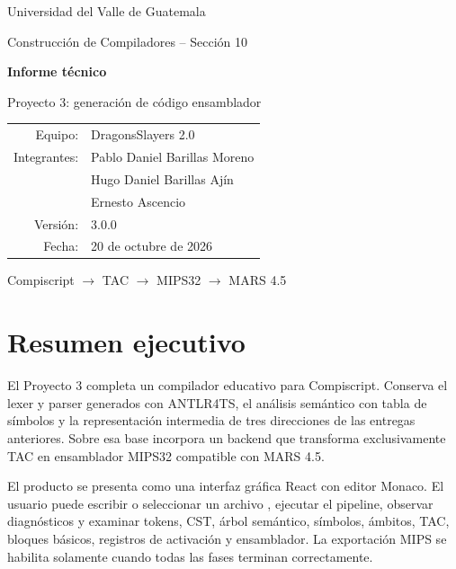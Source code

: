 \documentclass[11pt,letterpaper,oneside]{report}
\newcommand{\archivo}[1]{\texttt{\detokenize{#1}}}
\begin{document}
\begin{titlepage}
  \pagecolor{crema}\color{negro}
  \centering
  \vspace*{1.5cm}
  {\Large Universidad del Valle de Guatemala\par}
  \vspace{0.4cm}
  {\large Construcci\'on de Compiladores -- Secci\'on 10\par}
  \vspace{2cm}
  \vspace{1.4cm}

  {\Huge\bfseries Informe t\'ecnico\par}
  \vspace{0.3cm}
  {\LARGE Proyecto 3: generaci\'on de c\'odigo ensamblador\par}
  \vfill
  \begin{tabular}{rl}
    Equipo: & DragonsSlayers 2.0\\
    Integrantes: & Pablo Daniel Barillas Moreno\\
                 & Hugo Daniel Barillas Aj\'in\\
                 & Ernesto Ascencio\\
    Versi\'on: & 3.0.0\\
    Fecha: & 20 de octubre de 2026
  \end{tabular}
  \vfill
  {\large Compiscript $\rightarrow$ TAC $\rightarrow$ MIPS32 $\rightarrow$ MARS 4.5\par}
\end{titlepage}
\nopagecolor

\tableofcontents

\chapter{Resumen ejecutivo}

El Proyecto 3 completa un compilador educativo para Compiscript. Conserva el lexer y parser generados con ANTLR4TS, el an\'alisis sem\'antico con tabla de s\'imbolos y la representaci\'on intermedia de tres direcciones de las entregas anteriores. Sobre esa base incorpora un backend que transforma exclusivamente TAC en ensamblador MIPS32 compatible con MARS 4.5.

El producto se presenta como una interfaz gr\'afica React con editor Monaco. El usuario puede escribir o seleccionar un archivo \archivo{.cps}, ejecutar el pipeline, observar diagn\'osticos y examinar tokens, CST, \'arbol sem\'antico, s\'imbolos, \'ambitos, TAC, bloques b\'asicos, registros de activaci\'on y ensamblador. La exportaci\'on MIPS se habilita solamente cuando todas las fases terminan correctamente.
\end{document}
